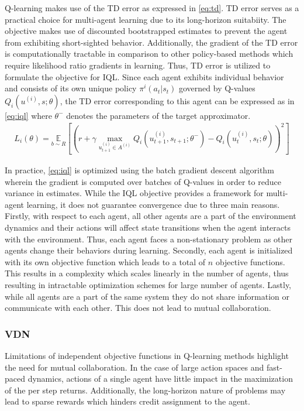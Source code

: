 \documentclass{article}
\begin{document}
\begin{multicols}{2}
Q-learning makes use of the TD error as expressed in \autoref{eq:td}. TD error serves as a practical choice for multi-agent learning due to its long-horizon suitabiity. The objective makes use of discounted bootstrapped estimates to prevent the agent from exhibiting short-sighted behavior. Additionally, the gradient of the TD error is computationally tractable in comparison to other policy-based methods \cite{rl} which require likelihood ratio gradients in learning. Thus, TD error is utilized to formulate the objective for IQL. Since each agent exhibits individual behavior and consists of its own unique policy $\pi^{i}(a_{t}|s_{t})$ governed by Q-values $Q_{i}(u^{(i)},s;\theta)$, the TD error corresponding to this agent can be expressed as in \autoref{eq:iql} where $\theta^{-}$ denotes the parameters of the target approximator. 
\begin{gather}
  L_{i}(\theta) = \underset{b \sim R}{\mathbb{E}}[(r + \gamma \underset{u^{(i)}_{t+1}\in A^{(i)}}{\max} Q_{i}(u^{(i)}_{t+1},s_{t+1};\theta^{-}) - Q_{i}(u_{t}^{(i)},s_{t};\theta))^{2}] \label{eq:iql}
\end{gather}

In practice, \autoref{eq:iql} is optimized using the batch gradient descent algorithm wherein the gradient is computed over batches of Q-values in order to reduce variance in estimates. While the IQL objective provides a framework for multi-agent learning, it does not guarantee convergence due to three main reasons. Firstly, with respect to each agent, all other agents are a part of the environment dynamics and their actions will affect state transitions when the agent interacts with the environment. Thus, each agent faces a non-stationary problem as other agents change their behaviors during learning. Secondly, each agent is initialized with its own objective function which leads to a total of $n$ objective functions. This results in a complexity which scales linearly in the number of agents, thus resulting in intractable optimization schemes for large number of agents. Lastly, while all agents are a part of the same system they do not share information or communicate with each other. This does not lead to mutual collaboration. 

\subsubsection{VDN}
Limitations of independent objective functions in Q-learning methods highlight the need for mutual collaboration. In the case of large action spaces \cite{hdqn} and fast-paced dynamics, actions of a single agent have little impact in the maximization of the per step returns. Additionally, the long-horizon nature \cite{hdqn} of problems may lead to sparse rewards which hinders credit assignment to the agent. 


\end{multicols}
\end{document}
